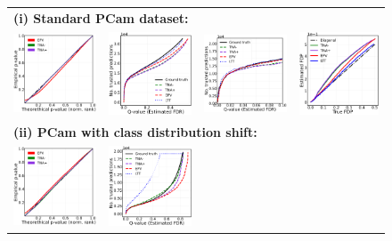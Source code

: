 \documentclass{article}
\begin{document}
\begin{figure}[h!]
	
	\begin{tabular}{cccc}
		\multicolumn{4}{l}{\bf (i) Standard PCam dataset:}\\		
		\includegraphics[width=0.225\linewidth, height=0.225\linewidth]{img/cnn_QQ_pcam.png} &
		\includegraphics[width=0.225\linewidth, height=0.225\linewidth]{img/cnn_pcam_fdr_control.png} & 
		\includegraphics[width=0.225\linewidth, height=0.225\linewidth]{img/cnn_pcam_fdr_control_loc.png} &
		\includegraphics[width=0.225\linewidth, height=0.225\linewidth]{img/cnn_FDPscat_pcam.png}\\	
		\multicolumn{4}{l}{\bf (ii) PCam with class distribution shift:}\\		
		\includegraphics[width=0.225\linewidth, height=0.225\linewidth]{img/cnn_QQ_pcam_balanced.png} &
		\includegraphics[width=0.225\linewidth, height=0.225\linewidth]{img/cnn_pcam_balanced_fdr_control.png} & 

\end{tabular}
\end{figure}
\end{document}
